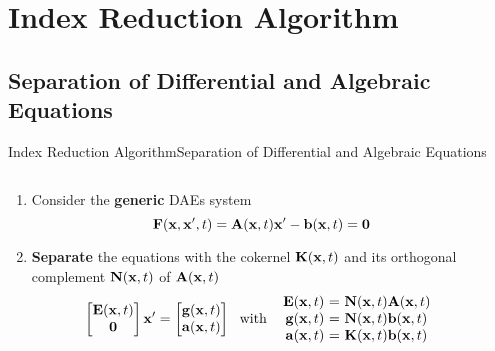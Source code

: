 
\section{Index Reduction Algorithm}

\subsection{Separation of Differential and Algebraic Equations}

\begin{frame}{Index Reduction Algorithm}{Separation of Differential and Algebraic Equations}
  \vspace{-1.0em}
  \begin{columns}
    \begin{column}[c]{0.6\textwidth}
      \begin{enumerate}[<+->]
        \item Consider the \textbf{generic} \acsp{DAE} system
        \begin{equation*}
          \mathbf{F}(\mathbf{x}, \mathbf{x}^\prime, t) = \mathbf{A}(\mathbf{x}, t) \mathbf{x}^\prime - \mathbf{b}(\mathbf{x}, t) = \mathbf{0}
        \end{equation*}
        \item \textbf{Separate} the equations with the cokernel $\mathbf{K}(\mathbf{x}, t)$ and its orthogonal complement $\mathbf{N}(\mathbf{x}, t)$ of $\mathbf{A}(\mathbf{x}, t)$
        \begin{equation*}
          \begin{bmatrix} \mE \\ \m{0} \end{bmatrix} \mxp = \begin{bmatrix} \mg \\ \ma \end{bmatrix}
          ~~ \text{with} ~~
          \begin{array}{r@{~}c@{~}l}
            \mE &=& \mN \mA \\
            \mg &=& \mN \mb \\
            \ma &=& \mK \mb
          \end{array}
        \end{equation*}
      \end{enumerate}
      \vspace{-1.0em}
    \end{column}
    \begin{column}[c]{0.4\textwidth}
    \end{column}
  \end{columns}
\end{frame}

